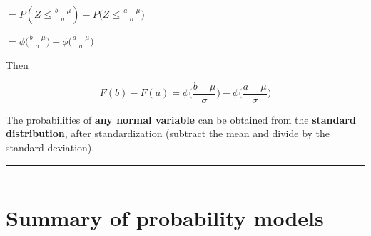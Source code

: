 \documentclass[
]{book}
\begin{document}
\(=P(Z \leq \frac{b-\mu}{\sigma})-P(Z \leq \frac{a-\mu}{\sigma}\big)\)

\(=\phi \big(\frac{b-\mu}{\sigma}\big)-\phi \big(\frac{a-\mu}{\sigma}\big)\)

Then

\[F(b)-F(a)=\phi \big(\frac{b-\mu}{\sigma}\big)-\phi \big(\frac{a-\mu}{\sigma}\big)\]

The probabilities of \textbf{any normal variable} can be obtained from the \textbf{standard distribution}, after standardization (subtract the mean and divide by the standard deviation).

\begin{center}\rule{0.5\linewidth}{0.5pt}\end{center}

\begin{center}\rule{0.5\linewidth}{0.5pt}\end{center}

\hypertarget{summary-of-probability-models}{%
\section{Summary of probability models}\label{summary-of-probability-models}}
\end{document}
